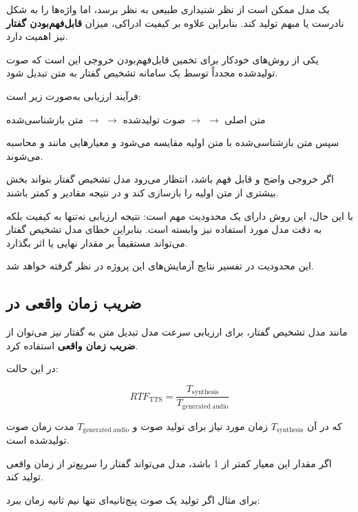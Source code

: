یک مدل  ممکن است از نظر شنیداری طبیعی به نظر برسد،
اما واژه‌ها را به شکل نادرست یا مبهم تولید کند.
بنابراین علاوه بر کیفیت ادراکی، میزان
\textbf{قابل‌فهم‌بودن گفتار}
نیز اهمیت دارد.

یکی از روش‌های خودکار برای تخمین قابل‌فهم‌بودن خروجی این است
که صوت تولیدشده مجدداً توسط یک سامانه تشخیص گفتار به متن
تبدیل شود.

فرآیند ارزیابی به‌صورت زیر است:

\begin{center}
متن اصلی
$\longrightarrow$
$\longrightarrow$
صوت تولیدشده
$\longrightarrow$
$\longrightarrow$
متن بازشناسی‌شده
\end{center}

سپس متن بازشناسی‌شده با متن اولیه مقایسه می‌شود و معیارهایی
مانند  و  محاسبه می‌شوند.

اگر خروجی  واضح و قابل فهم باشد، انتظار می‌رود مدل
تشخیص گفتار بتواند بخش بیشتری از متن اولیه را بازسازی کند و
در نتیجه مقادیر  و  کمتر باشند.

با این حال، این روش دارای یک محدودیت مهم است:
نتیجه ارزیابی نه‌تنها به کیفیت  بلکه به دقت مدل
 مورد استفاده نیز وابسته است.
بنابراین خطای مدل تشخیص گفتار می‌تواند مستقیماً بر مقدار نهایی
 یا  اثر بگذارد.

این محدودیت در تفسیر نتایج آزمایش‌های  این پروژه
در نظر گرفته خواهد شد.


\subsection{ضریب زمان واقعی در }

مانند مدل تشخیص گفتار، برای ارزیابی سرعت مدل تبدیل متن به
گفتار نیز می‌توان از
\textbf{ضریب زمان واقعی}
استفاده کرد.

در این حالت:

\begin{equation}
RTF_{\mathrm{TTS}}
=
\frac{T_{\mathrm{synthesis}}}
     {T_{\mathrm{generated\ audio}}}
\end{equation}

که در آن $T_{\mathrm{synthesis}}$ زمان مورد نیاز برای تولید
صوت و $T_{\mathrm{generated\ audio}}$ مدت زمان صوت تولیدشده
است.

اگر مقدار این معیار کمتر از 1 باشد، مدل می‌تواند گفتار را
سریع‌تر از زمان واقعی تولید کند.

برای مثال اگر تولید یک صوت پنج‌ثانیه‌ای تنها نیم ثانیه زمان
ببرد:

